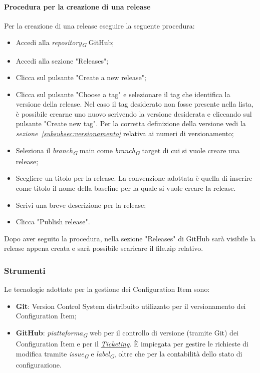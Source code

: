 \paragraph{Procedura per la creazione di una release}
Per la creazione di una release eseguire la seguente procedura:
\begin{itemize}
    \item Accedi alla \textit{repository}\textsubscript{\textit{G}} GitHub;
    \item Accedi alla sezione "Releases";
    \item Clicca sul pulsante "Create a new release";
    \item Clicca sul pulsante "Choose a tag" e selezionare il tag che identifica la versione della release. Nel caso il tag desiderato non fosse presente nella lista, è possibile crearne uno nuovo scrivendo la versione desiderata e cliccando sul pulsante "Create new tag". Per la corretta definizione della versione vedi la \textit{sezione~\ref{subsubsec:versionamento}} relativa ai numeri di versionamento;
    \item Seleziona il \textit{branch}\textsubscript{\textit{G}} main come \textit{branch}\textsubscript{\textit{G}} target di cui si vuole creare una release;
    \item Scegliere un titolo per la release. La convenzione adottata è quella di inserire come titolo il nome della baseline per la quale si vuole creare la release.
    \item Scrivi una breve descrizione per la release;
    \item Clicca "Publish release".
\end{itemize}

Dopo aver seguito la procedura, nella sezione "Releases" di GitHub sarà visibile la release appena creata e sarà possibile scaricare il file.zip relativo.

\subsubsection{Strumenti}
Le tecnologie adottate per la gestione dei Configuration Item sono:
\begin{itemize}
    \item \textbf{Git}: Version Control System distribuito utilizzato per il versionamento dei Configuration Item;
    \item \textbf{GitHub}: \textit{piattaforma}\textsubscript{\textit{G}} web per il controllo di versione (tramite Git) dei Configuration Item e per il \hyperlink{par:ticketing}{\textit{Ticketing}}. È impiegata per gestire le richieste di modifica tramite \textit{issue}\textsubscript{\textit{G}} e \textit{label}\textsubscript{\textit{G}}, oltre che per la contabilità dello stato di configurazione.
\end{itemize}

